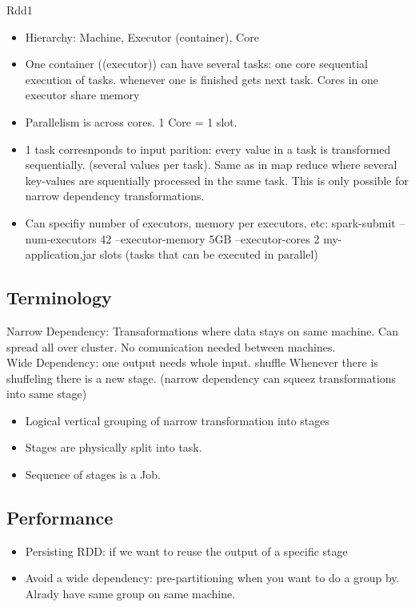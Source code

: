 Rdd1 \textrightarrow

\begin{itemize}
    \item Hierarchy: Machine, Executor (container), Core
    \item One container ((executor)) can have several tasks:
one core sequential execution of tasks. whenever one is finished gets next task. Cores in one executor share memory
    \item Parallelism is across cores. 1 Core = 1 slot.
    \item 1 task corresnponds to input parition: every value in a task is transformed sequentially.
    (several values per task). Same as in map reduce where several key-values are squentially processed in the same task.
    This is only possible for narrow dependency transformations.
    \item Can specifiy number of executors, memory per executors, etc: spark-submit --num-executors 42 --executor-memory 5GB
    --executor-cores 2 my-application.jar  slots (tasks that can be executed in parallel)
\end{itemize}

\subsection{Terminology}
Narrow Dependency: Transaformations where data stays on same machine. Can spread all over cluster.
No comunication needed between machines. \\
Wide Dependency: one output needs whole input. \textrightarrow shuffle
Whenever there is shuffeling there is a new stage. (narrow dependency can squeez transformations into same stage)\\
\begin{itemize}
    \item Logical vertical grouping of narrow transformation into stages
    \item Stages are physically split into task.
    \item Sequence of stages is a Job.
\end{itemize}

\subsection{Performance}
\begin{itemize}
    \item Persisting RDD: if we want to reuse the output of a specific stage
    \item Avoid a wide dependency: pre-partitioning when you want to do a group by. Alrady have same group on same machine.
\end{itemize}

